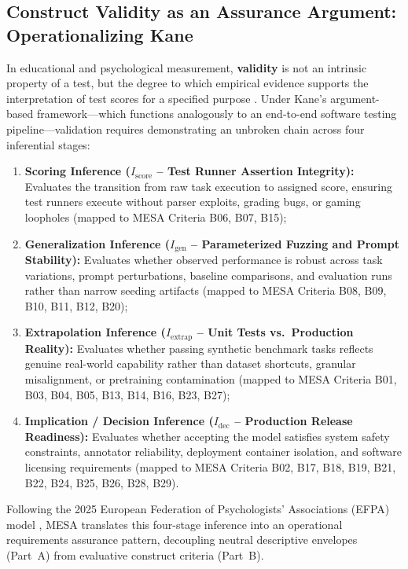 \documentclass[runningheads]{llncs}
\begin{document}
\subsection{Construct Validity as an Assurance Argument: Operationalizing Kane}
In educational and psychological measurement, \textbf{validity} is not an intrinsic property of a test, but the degree to which empirical evidence supports the interpretation of test scores for a specified purpose \cite{kane_validation,aera_apa_ncme_standards_2014}. Under Kane's argument-based framework---which functions analogously to an end-to-end software testing pipeline---validation requires demonstrating an unbroken chain across four inferential stages:
\begin{enumerate}[leftmargin=*]
    \item \textbf{Scoring Inference ($I_{\text{score}}$ -- Test Runner Assertion Integrity):} Evaluates the transition from raw task execution to assigned score, ensuring test runners execute without parser exploits, grading bugs, or gaming loopholes (mapped to MESA Criteria B06, B07, B15);
    \item \textbf{Generalization Inference ($I_{\text{gen}}$ -- Parameterized Fuzzing and Prompt Stability):} Evaluates whether observed performance is robust across task variations, prompt perturbations, baseline comparisons, and evaluation runs rather than narrow seeding artifacts (mapped to MESA Criteria B08, B09, B10, B11, B12, B20);
    \item \textbf{Extrapolation Inference ($I_{\text{extrap}}$ -- Unit Tests vs.\ Production Reality):} Evaluates whether passing synthetic benchmark tasks reflects genuine real-world capability rather than dataset shortcuts, granular misalignment, or pretraining contamination (mapped to MESA Criteria B01, B03, B04, B05, B13, B14, B16, B23, B27);
    \item \textbf{Implication / Decision Inference ($I_{\text{dec}}$ -- Production Release Readiness):} Evaluates whether accepting the model satisfies system safety constraints, annotator reliability, deployment container isolation, and software licensing requirements (mapped to MESA Criteria B02, B17, B18, B19, B21, B22, B24, B25, B26, B28, B29).
\end{enumerate}
Following the 2025 European Federation of Psychologists' Associations (EFPA) model \cite{efpa_test_review_model_2025}, MESA translates this four-stage inference into an operational requirements assurance pattern, decoupling neutral descriptive envelopes (Part~A) from evaluative construct criteria (Part~B).
\end{document}
